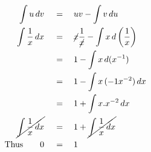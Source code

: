 \begin{align*}
\int u\,dv\quad&\,=\quad uv-\int v\,du\\
\int\frac{1}{x}\,dx\quad&\,=\quad\cancel{x}\frac{1}{\cancel{x}}-\int x\,d\left(\frac{1}{x}\right)\\
\,&\,=\quad1-\int x\,d(x^{-1})\\
\,&\,=\quad1-\int x\,(-1x^{-2})\,dx\\
\,&\,=\quad1+\int x.x^{-2}\,dx\\
\cancel{\int\frac{1}{x}\,dx}\quad&\,=\quad1+\cancel{\int\frac{1}{x}\,dx}\\
\mathrm{Thus}\qquad0\quad&\,=\quad1
\end{align*}
